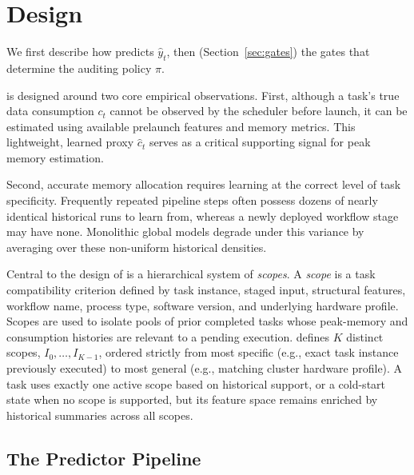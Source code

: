 
\section{\toolname{} Design}
\label{sec:design}

We first describe how \toolname{} predicts $\hat{y}_t$, then (Section~\ref{sec:gates}) the gates that determine the auditing policy $\pi$.

\toolname  is designed around two core empirical observations. First, although a task's true data consumption $c_t$ cannot be observed by the scheduler before launch, it can be estimated using available prelaunch features and memory metrics. This lightweight, learned proxy $\hat{c}_t$ serves as a critical supporting signal for peak memory estimation.

Second, accurate memory allocation requires learning at the correct level of task specificity. Frequently repeated pipeline steps often possess dozens of nearly identical historical runs to learn from, whereas a newly deployed workflow stage may have none. Monolithic global models degrade under this variance by averaging over these non-uniform historical densities.

Central to the design of \toolname{} is a hierarchical system of \textit{scopes}. A \textit{scope} is a task compatibility criterion defined by task instance, staged input, structural features, workflow name, process type, software version, and underlying hardware profile. Scopes are used to isolate pools of prior completed tasks whose peak-memory and consumption histories are relevant to a pending execution. \toolname{} defines $K$ distinct scopes, $I_0, \dots, I_{K-1}$, ordered strictly from most specific (e.g., exact task instance previously executed) to most general (e.g., matching cluster hardware profile). A task uses exactly one active scope based on historical support, or a cold-start state when no scope is supported, but its feature space remains enriched by historical summaries across all scopes.

\subsection{The Predictor Pipeline}

